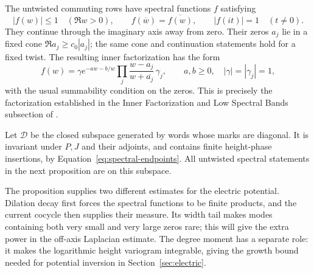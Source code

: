 The untwisted commuting rows have spectral functions $f$ satisfying
\begin{equation}\label{eq:spectral-inner-input}
 |f(w)|\le1\quad(\Re w>0),\qquad
 f(\overline w)=\overline{f(w)},\qquad |f(it)|=1\quad(t\ne0).
\end{equation}
They continue through the imaginary axis away from zero.  Their zeros
$a_j$ lie in a fixed cone $\Re a_j\ge c_0|a_j|$; the same cone and
continuation statements hold for a fixed twist.  The resulting inner
factorization has the form
\begin{equation}\label{eq:general-spectral-factorization}
 f(w)=\gamma e^{-a w-b/w}
       \prod_j\frac{w-a_j}{w+\overline{a_j}}\,\gamma_j,
 \qquad a,b\ge0,\quad |\gamma|=|\gamma_j|=1,
\end{equation}
with the usual summability condition on the zeros.  This is precisely
the factorization established in the Inner Factorization and Low
Spectral Bands subsection of \cite{FKCompanion}.

Let $\mathcal D$ be the closed subspace generated by words whose marks
are diagonal.  It is invariant under $P,J$ and their adjoints, and
contains finite height-phase insertions, by
Equation~\eqref{eq:spectral-endpoints}.  All untwisted spectral
statements in the next proposition are on this subspace.

The proposition supplies two different estimates for the electric
potential.  Dilation decay first forces the spectral functions to
be finite products, and the current cocycle then supplies their
measure.  Its width tail makes modes containing both very small
and very large zeros rare; this will give the extra power in the
off-axis Laplacian estimate.  The degree moment has a separate
role: it makes the logarithmic height variogram integrable, giving
the growth bound needed for potential inversion in
Section~\ref{sec:electric}.

